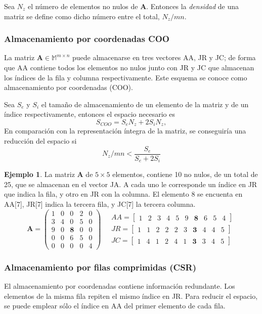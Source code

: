 \documentclass{article}
\newcommand*\mat[1]{ \begin{pmatrix} #1 \end{pmatrix}}
\newcommand*\arr[1]{ \begin{bmatrix} #1 \end{bmatrix}}
\theoremstyle{definition}
\newtheorem{ejemplo}{Ejemplo}[section]
\begin{document}
Sea $N_z$ el número de elementos no nulos de \textbf{A}. Entonces la 
\textit{densidad} de una matriz se define como dicho número entre el total, 
$N_z/mn$.

\subsubsection{Almacenamiento por coordenadas COO}

La matriz $\textbf{A} \in \mathbb{M}^{m\times n}$ puede almacenarse en tres 
vectores AA, JR y JC; de forma que AA contiene todos los elementos no nulos 
junto con JR y JC que almacenan los índices de la fila y columna 
respectivamente. Este esquema se conoce como almacenamiento por coordenadas 
(COO).

Sea $S_e$ y $S_i$ el tamaño de almacenamiento de un elemento de la matriz y de 
un índice respectivamente, entonces el espacio necesario es
$$ S_{COO} = S_eN_z + 2S_iN_z, $$
En comparación con la representación íntegra de la matriz, se conseguiría una 
reducción del espacio si
$$ N_z/mn < \frac{S_e}{S_e + 2S_i} $$

\begin{ejemplo}
La matriz \textbf{A} de $5\times5$ elementos, contiene 10 no nulos, de un total 
de 25, que se almacenan en el vector JA. A cada uno le corresponde un índice en 
JR que indica la fila, y otro en JR con la columna. El elemento 8 se encuenta en 
AA[7], JR[7] indica la tercera fila, y JC[7] la tercera columna.
$$ \textbf{A} = \mat{
	1 & 0 & 0 & 2 & 0 \\
	3 & 4 & 0 & 5 & 0 \\
	9 & 0 & \textbf{8} & 0 & 0 \\
	0 & 0 & 6 & 5 & 0 \\
	0 & 0 & 0 & 0 & 4 }
\quad
\begin{aligned}
	AA = \arr{ 1 & 2 & 3 & 4 & 5 & 9 & \textbf{8} & 6 & 5 & 4} \\
	JR = \arr{ 1 & 1 & 2 & 2 & 2 & 3 & \textbf{3} & 4 & 4 & 5} \\
	JC = \arr{ 1 & 4 & 1 & 2 & 4 & 1 & \textbf{3} & 3 & 4 & 5}
\end{aligned}
$$
\end{ejemplo}

\subsubsection{Almacenamiento por filas comprimidas (CSR)}

El almacenamiento por coordenadas contiene información redundante. Los elementos 
de la misma fila repiten el mismo índice en JR. Para reducir el espacio, se 
puede emplear sólo el índice en AA del primer elemento de cada fila.
\end{document}

